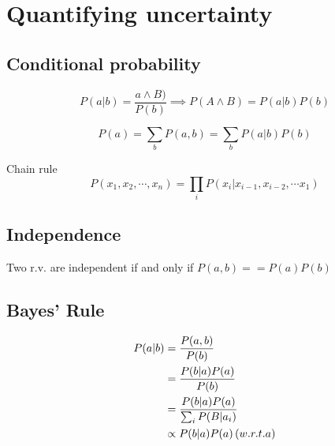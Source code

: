 \section{Quantifying uncertainty}

\subsection{Conditional probability}

\begin{equation}
    P(a|b) = \frac{a \wedge B)}{P(b)}  \implies P(A \wedge B) = P(a|b) P(b)
\end{equation}

\begin{equation}
    P(a) = \sum_{b}{P(a, b)} = \sum_{b}{P(a|b)P(b)}
\end{equation}

Chain rule
\begin{equation}
    P(x_1, x_2, \cdots, x_n) = \prod_{i}{P(x_i|x_{i-1}, x_{i-2}, \cdots x_1)}
\end{equation}

\subsection{Independence}

Two r.v. are independent if and only if $P(a, b) == P(a)P(b)$

\subsection{Bayes' Rule}


\begin{equation}
\begin{aligned}
    P(a|b) &= \frac{P(a, b)}{P(b)} \\
    &= \frac{P(b|a)P(a)}{P(b)} \\
    &= \frac{P(b|a)P(a)}{\sum_{i}{P(B|a_i)}} \\
    &\propto P(b|a)P(a) \thinspace  (w.r.t. a) 
\end{aligned}
\end{equation}



